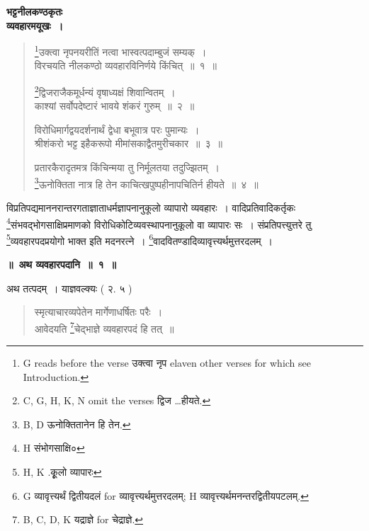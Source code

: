 \documentclass[11pt, openany]{book}
\begin{document}
\newpage
\thispagestyle{empty}

\begin{center}
\textbf{\large भट्टनीलकण्ठकृतः}\\

\vspace{2mm}
\textbf{\huge व्यवहारमयूखः~।}
\end{center}

\begin{quote}
{\vy \renewcommand{\thefootnote}{1}\footnote{G reads before the verse उक्त्वा नृप elaven other verses for which see Introduction.}उक्त्वा नृपनयरीतिं नत्वा भास्वत्पदाम्बुजं सम्यक्~।\\
विरचयति नीलकण्ठो व्यवहारविनिर्णये किंचित्~॥~१~॥

\renewcommand{\thefootnote}{2}\footnote{C, G, H, K, N omit the verses {\qt द्विज \ldots हीयते}.}द्विजराजैकमूर्धन्यं वृषाध्यक्षं शिवान्वितम्~।\\
काश्यां सर्वोपदेष्टारं भावये शंकरं गुरुम्~॥~२~॥

विरोधिमार्गद्वयदर्शनार्थं द्वेधा बभूवात्र परः पुमान्यः~।\\
श्रीशंकरो भट्ट इहैकरूपो मीमांसकाद्वैतमुरीचकार~॥~३~॥

प्रतारकैरादृतमत्र किंचिन्मया तु निर्मूलतया तदुज्झितम्~।\\
\renewcommand{\thefootnote}{3}\footnote{B, D ऊनोक्तितानेन हि तेन.}ऊनोक्तिता नात्र हि तेन काचित्खपुष्पहीनापचितिर्न हीयते~॥~४~॥}
\end{quote}

विप्रतिपद्यमाननरान्तरगताज्ञाताधर्मज्ञापनानुकूलो व्यापारो व्यवहारः~। वादिप्रतिवादिकर्तृकः \renewcommand{\thefootnote}{4}\footnote{H संभोगसाक्षि०}संभवद्भोगसाक्षिप्रमाणको विरोधिकोटिव्यवस्थापनानुकूलो वा व्यापारः सः~। संप्रतिपत्त्युत्तरे तु \renewcommand{\thefootnote}{5}\footnote{H, K .कृूलो व्यापारः}व्यवहारपदप्रयोगो भाक्त इति मदनरत्ने~। \renewcommand{\thefootnote}{6}\footnote{G व्यावृत्त्यर्थं द्वितीयदलं for व्यावृत्त्यर्थमुत्तरदलम्; H व्यावृत्त्यर्थमनन्तरद्वितीयपटलम्.}वादवितण्डादिव्यावृत्त्यर्थमुत्तरदलम्~। 

\begin{center}
\textbf{\Large ॥~अथ व्यवहारपदानि~॥~१~॥}
\end{center}

अथ तत्पदम्~। याज्ञवल्क्यः ( २. ५ )

\begin{quote}
{\vy स्मृत्याचारव्यपेतेन मार्गेणाधर्षितः परैः~।\\
आवेदयति \renewcommand{\thefootnote}{7}\footnote{B, C, D, K यद्राज्ञे for चेद्राज्ञे.}चेद्भाज्ञे व्यवहारपदं हि तत्~॥}
\end{quote}
\end{document}
